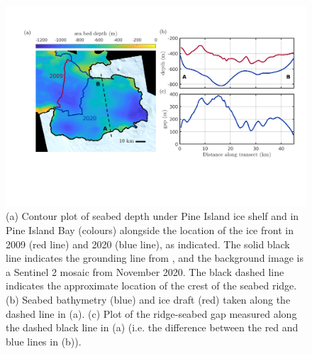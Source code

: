 \documentclass[draft]{agujournal2019}
\begin{document}
\begin{figure}
    \centering
    \includegraphics[width = \textwidth]{../make_figures/plots/figure1_cropped.pdf}
    \caption{(a) Contour plot of seabed depth under Pine Island ice shelf and in Pine Island Bay (colours) alongside the location of the ice front in 2009 (red line) and 2020 (blue line), as indicated. The solid black line indicates the grounding line from , and the background image is a Sentinel 2 mosaic from November 2020. The black dashed line indicates the approximate location of the crest of the seabed ridge. (b) Seabed bathymetry (blue) and ice draft (red) taken along the dashed line in (a). (c) Plot of the ridge-seabed gap measured along the dashed black line in (a) (i.e. the difference between the red and blue lines in (b)). }
    \label{fig:figure1}
\end{figure}
\end{document}
